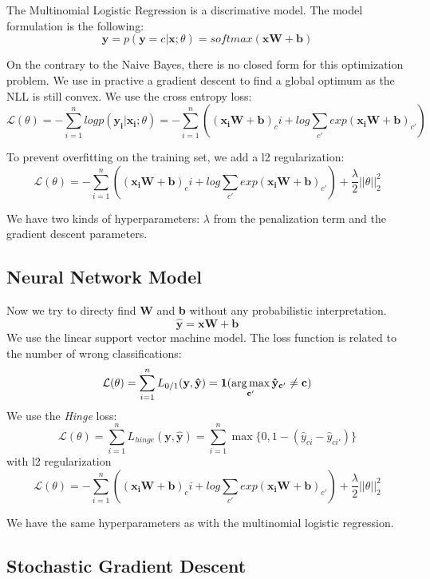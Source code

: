 \documentclass[11pt]{article}
\begin{document}
The Multinomial Logistic Regression is a discrimative model. The model formulation is the following:
\[\mathbf{\hat{y}} = p(\mathbf{y} = c | \mathbf{x} ; \theta) = softmax(\mathbf{xW} + \mathbf{b}) \]

\noindent On the contrary to the Naive Bayes, there is no closed form for this optimization problem. We use in practive a gradient descent to find a global optimum as the NLL is still convex. We use the cross entropy loss:
\[ \mathcal{L}(\theta) = - \sum_{i=1}^{n} log p(\mathbf{y_i}| \mathbf{x_i}; \theta) = - \sum_{i=1}^{n} \left( (\mathbf{x_i W} + \mathbf{b})_ci + log \sum_{c'} exp(\mathbf{x_i W} + \mathbf{b})_{c'} \right) \]

\noindent To prevent overfitting on the training set, we add a l2 regularization:
\[ \mathcal{L}(\theta) = - \sum_{i=1}^{n} \left( (\mathbf{x_i W} + \mathbf{b})_ci + log \sum_{c'} exp(\mathbf{x_i W} + \mathbf{b})_{c'} \right) + \frac{\lambda}{2} ||\theta||_2^2\]

\noindent We have two kinds of hyperparameters: $\lambda$ from the penalization term and the gradient descent parameters.

\subsection{Neural Network Model}

Now we try to directy find \textbf{W} and \textbf{b} without any probabilistic interpretation.
\[\mathbf{\hat{y}} = \mathbf{xW} + \mathbf{b} \]
We use the linear support vector machine model. The loss function is related to the number of wrong classifications:
  \[\mathcal{L}(\theta) = \sum_{i=1}^n L_{0/1}(\mathbf{y}, \mathbf{\hat{y}}) = \mathbf{1(\argmax_{c'} \hat{y}_{c'} \neq c)}\]
  We use the \textit{Hinge} loss:
    \[\mathcal{L}(\theta) = \sum_{i=1}^n L_{hinge}(\mathbf{y},\hat{\mathbf{y}}) =  \sum_{i=1}^n \max\{0, 1 - (\hat{y}_{ci} - \hat{y}_{ci'}) \}  \]
with l2 regularization
\[ \mathcal{L}(\theta) = - \sum_{i=1}^{n} \left( (\mathbf{x_i W} + \mathbf{b})_ci + log \sum_{c'} exp(\mathbf{x_i W} + \mathbf{b})_{c'} \right) + \frac{\lambda}{2} ||\theta||_2^2\]

\noindent We have the same hyperparameters as with the multinomial logistic regression.

\subsection{Stochastic Gradient Descent}
\end{document}
